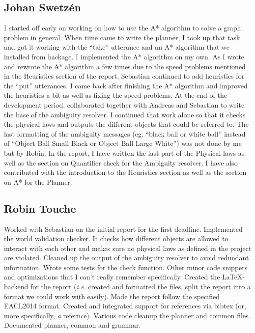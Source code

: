 \subsection*{Johan Swetz\'en}
I started off early on working on how to use the A* algorithm to solve a graph problem in general.
When time came to write the planner, I took up that task and got it working with the ``take'' utterance and an A* algorithm that we installed from hackage.
\newline
\newline
I implemented the A* algorithm on my own.
As I wrote and rewrote the A* algorithm a few times due to the speed problems mentioned in the Heuristics section of the report, Sebastian continued to add heuristics for the ``put'' utterances. I came back after finishing the A* algorithm and improved the heuristics a bit as well as fixing the speed problems.
\newline
\newline
At the end of the development period, collaborated together with Andreas and Sebastian to write the base of the ambiguity resolver.
I continued that work alone so that it checks the physical laws and outputs the different objects that could be referred to.
The last formatting of the ambiguity messages (eg. ``black ball or white ball'' instead of ``Object Ball Small Black or Object Ball Large White'') was not done by me but by Robin.
\newline
\newline
In the report, I have written the last part of the Physical laws as well as the section on Quantifier check for the Ambiguity resolver.
I have also contributed with the introduction to the Heuristics section as well as the section on A* for the Planner.

\subsection*{Robin Touche}
Worked with Sebastian on the initial report for the first deadline.
\newline
\newline
Implemented the world validation checker.
It checks how different objects are allowed to interact with each other and makes sure no physical laws as defined in the project are violated.
Cleaned up the output of the ambiguity resolver to avoid redundant information.
Wrote some tests for the check function.
Other minor code snippets and optimizations that I can't really remember specifically.
\newline
\newline
Created the \LaTeX-backend for the report (\emph{i.e.} created and formatted the files, split the report into a format we could work with easily).
Made the report follow the specified EACL2014 format.
Created and integrated support for references via bibtex (or, more specifically, \emph{a} refernce).
\newline
\newline
Various code cleanup the planner and common files.
Documented planner, common and grammar.
